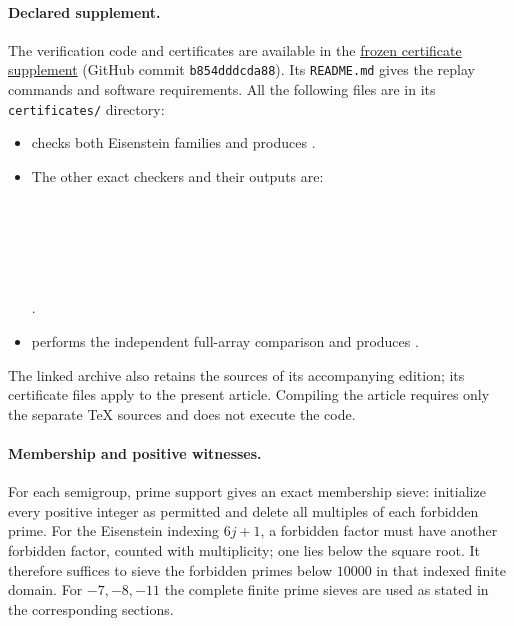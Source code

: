 \paragraph{Declared supplement.}
The verification code and certificates are available in the
\href{https://raw.githubusercontent.com/royvanrijn/jacobian-research/b854dddcda88fd9c733d18e14a8ff5ae4a0b25b8/unpublished/eisenstein-restricted-prime-sums/source.zip}{frozen certificate supplement}
(GitHub commit \texttt{b854dddcda88}). Its \texttt{README.md}
gives the replay commands and software requirements. All the following files
are in its
\texttt{certificates/} directory:
\begin{itemize}
\item {} checks both Eisenstein families
and produces .
\item The other exact checkers and their outputs are:
\begin{flushleft}
\\
\\[2pt]
\\
\\[2pt]
\\
.
\end{flushleft}
\item {} performs
the independent full-array comparison and produces
.
\end{itemize}
The linked archive also retains the sources of its accompanying edition;
its certificate files apply to the present article. Compiling the article
requires only the separate TeX sources and does not execute the code.

\paragraph{Membership and positive witnesses.}
For each semigroup, prime support gives an exact membership sieve:
initialize every positive integer as permitted and delete all multiples
of each forbidden prime.  For the Eisenstein indexing $6j+1$, a
forbidden factor must have another forbidden factor, counted with
multiplicity; one lies below the square root.  It therefore suffices to
sieve the forbidden primes below $10000$ in that indexed finite domain.
For $-7,-8,-11$ the complete finite prime sieves are used as stated
in the corresponding sections.

